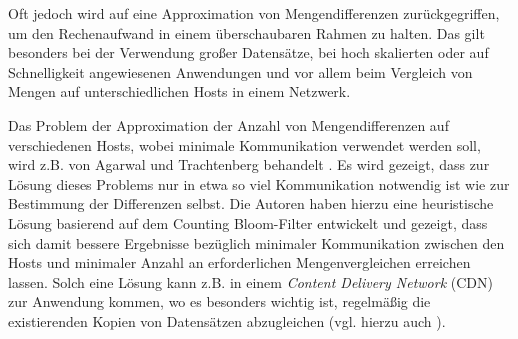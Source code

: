 Oft jedoch wird auf eine Approximation von Mengendifferenzen zurückgegriffen, um den Rechenaufwand in einem überschaubaren Rahmen zu halten. Das gilt besonders bei der Verwendung großer Datensätze, bei hoch skalierten oder auf Schnelligkeit angewiesenen Anwendungen und vor allem beim Vergleich von Mengen auf unterschiedlichen Hosts in einem Netzwerk. 

Das Problem der Approximation der Anzahl von Mengendifferenzen auf verschiedenen Hosts, wobei minimale Kommunikation verwendet werden soll, wird z.B. von Agarwal und Trachtenberg behandelt \cite{Agarwal2006}. Es wird gezeigt, dass zur Lösung dieses Problems nur in etwa so viel Kommunikation notwendig ist wie zur Bestimmung der Differenzen selbst. Die Autoren haben hierzu eine heuristische Lösung basierend auf dem Counting Bloom-Filter entwickelt und gezeigt, dass sich damit bessere Ergebnisse bezüglich minimaler Kommunikation zwischen den Hosts und minimaler Anzahl an erforderlichen Mengenvergleichen erreichen lassen. Solch eine Lösung kann z.B. in einem \textit{Content Delivery Network} (CDN) zur Anwendung kommen, wo es besonders wichtig ist, regelmäßig die existierenden Kopien von Datensätzen abzugleichen (vgl. hierzu auch \cite{Byers2002}). 

